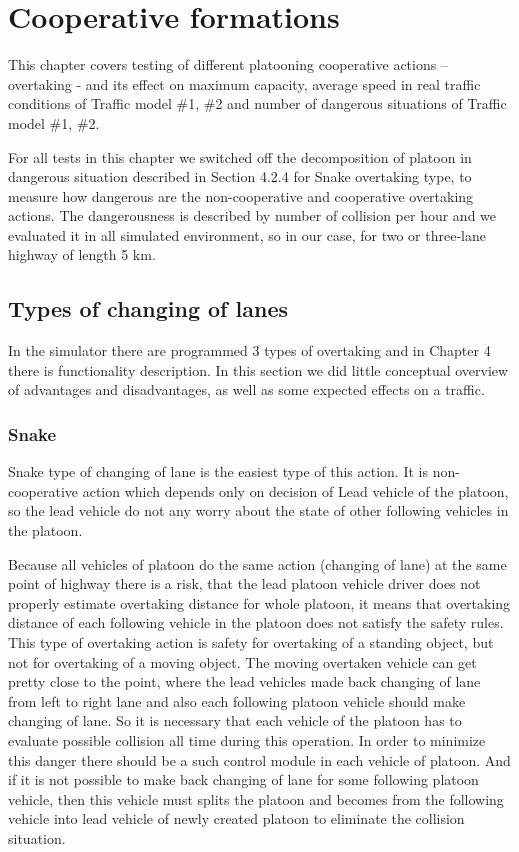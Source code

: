 \chapter{Cooperative formations}

This chapter covers testing of different platooning cooperative actions – overtaking - and its effect on maximum capacity, average speed in real traffic conditions of Traffic model \#1, \#2 and number of dangerous situations of Traffic model \#1, \#2. 

For all tests in this chapter we switched off the decomposition of platoon in dangerous situation described in Section 4.2.4 for Snake overtaking type, to measure how dangerous are the non-cooperative and cooperative overtaking actions. The dangerousness is described by number of collision per hour and we evaluated it in all simulated environment, so in our case, for two or three-lane highway of length 5 km.

\section{Types of changing of lanes}

In the simulator there are programmed 3 types of overtaking and in Chapter 4 there is functionality description. In this section we did little conceptual overview of advantages and disadvantages, as well as some expected effects on a traffic.

\subsection{Snake}

Snake type of changing of lane is the easiest type of this action. It is non-cooperative action which depends only on decision of Lead vehicle of the platoon, so the lead vehicle do not any worry about the state of other following vehicles in the platoon.

Because all vehicles of platoon do the same action (changing of lane) at the same point of highway there is a risk, that the lead platoon vehicle driver does not properly estimate overtaking distance for whole platoon, it means that overtaking distance of each following vehicle in the platoon does not satisfy the safety rules. This type of overtaking action is safety for overtaking of a standing object, but not for overtaking of a moving object. The moving overtaken vehicle can get pretty close to the point, where the lead vehicles made back changing of lane from left to right lane and also each following platoon vehicle should make changing of lane. So it is necessary that each vehicle of the platoon has to evaluate possible collision all time during this operation. In order to minimize this danger there should be a such control module in each vehicle of platoon. And if it is not possible to make back changing of lane for some following platoon vehicle, then this vehicle must splits the platoon and becomes from the following vehicle into lead vehicle of newly created platoon to eliminate the collision situation.

